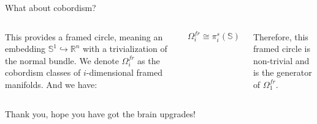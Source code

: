 \documentclass[12pt]{beamer}
\begin{document}
\begin{frame}{What about cobordism?}
\begin{columns}
\pause
{}
This provides a framed circle, meaning an embedding $\mathbb{S}^1 \hookrightarrow \mathbb{R}^n$ with a trivialization of the normal bundle. We denote $\Omega^{fr}_i$ as the cobordism classes of $i$-dimensional framed manifolds. \pause And we have:

\[
  \Omega^{fr}_i \cong \pi^s_i(\mathbb{S}) 
\]

Therefore, this framed circle is non-trivial and is the generator of $\Omega^{fr}_1$.

\end{columns}
\end{frame}
\begin{frame}{Thank you, hope you have got the brain upgrades!}
  
\begin{figure}
  \begin{center}

\end{center}
\end{figure}
\end{frame}
\end{document}
